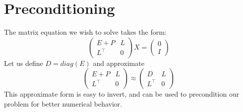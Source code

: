 



















\section{Preconditioning}

The matrix equation we wish to solve takes the form:
\[\begin{pmatrix}
E+P & L\\
L^\top & 0
\end{pmatrix}
X = 
\begin{pmatrix}
0 \\ I
\end{pmatrix}\]
Let us define $D = diag(E)$ and approximate
\[\begin{pmatrix}
E+P & L\\
L^\top & 0
\end{pmatrix}
\approx
\begin{pmatrix}
D & L\\
L^\top & 0
\end{pmatrix}\]
This approximate form is easy to invert, and can be used to precondition our problem for better numerical behavior.

